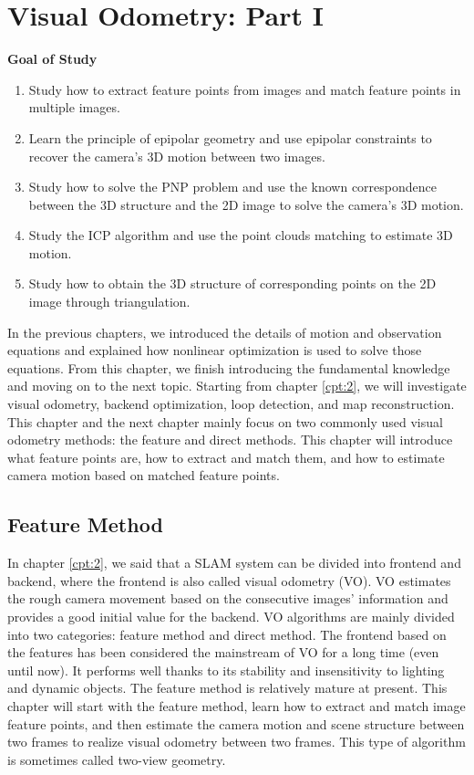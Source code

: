 \chapter{Visual Odometry: Part I}
\label{cpt:7}
\thispagestyle{empty}

\begin{mdframed}  
	\textbf{Goal of Study}
	\begin{enumerate}[labelindent=0em,leftmargin=1.5em]
		\item Study how to extract feature points from images and match feature points in multiple images.
		\item Learn the principle of epipolar geometry and use epipolar constraints to recover the camera's 3D motion between two images.
		\item Study how to solve the PNP problem and use the known correspondence between the 3D structure and the 2D image to solve the camera's 3D motion.	
		\item Study the ICP algorithm and use the point clouds matching to estimate 3D motion.
		\item Study how to obtain the 3D structure of corresponding points on the 2D image through triangulation.
	\end{enumerate}
\end{mdframed}

In the previous chapters, we introduced the details of motion and observation equations and explained how nonlinear optimization is used to solve those equations. From this chapter, we finish introducing the fundamental knowledge and moving on to the next topic. Starting from chapter \ref{cpt:2}, we will investigate visual odometry, backend optimization, loop detection, and map reconstruction. This chapter and the next chapter mainly focus on two commonly used visual odometry methods: the feature and direct methods. This chapter will introduce what feature points are, how to extract and match them, and how to estimate camera motion based on matched feature points.

\newpage


\newpage

\section{Feature Method}
In chapter \ref{cpt:2}, we said that a SLAM system can be divided into frontend and backend, where the frontend is also called visual odometry (VO). VO estimates the rough camera movement based on the consecutive images' information and provides a good initial value for the backend. VO algorithms are mainly divided into two categories: feature method and direct method. The frontend based on the features has been considered the mainstream of VO for a long time (even until now). It performs well thanks to its stability and insensitivity to lighting and dynamic objects. The feature method is relatively mature at present. This chapter will start with the feature method, learn how to extract and match image feature points, and then estimate the camera motion and scene structure between two frames to realize visual odometry between two frames. This type of algorithm is sometimes called two-view geometry.

